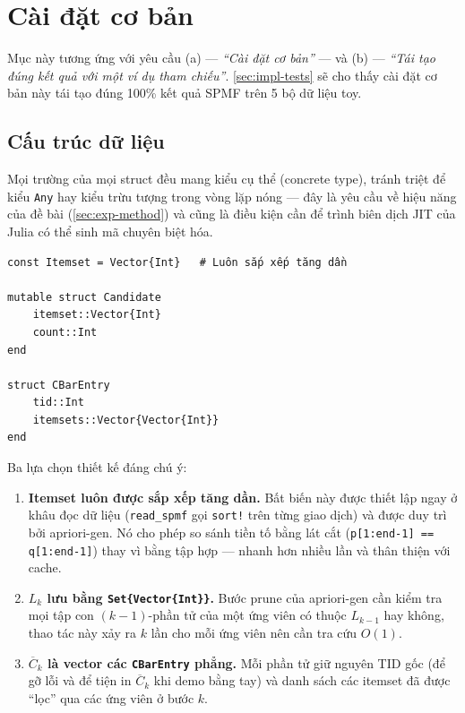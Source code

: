 \section{Cài đặt cơ bản}
\label{sec:impl-core}

Mục này tương ứng với yêu cầu (a) --- \emph{``Cài đặt cơ bản''} --- và (b) --- \emph{``Tái tạo đúng kết quả với một ví dụ tham chiếu''}. \autoref{sec:impl-tests} sẽ cho thấy cài đặt cơ bản này tái tạo đúng 100\% kết quả SPMF trên 5 bộ dữ liệu toy.

\subsection{Cấu trúc dữ liệu}

Mọi trường của mọi struct đều mang kiểu cụ thể (concrete type), tránh triệt để kiểu \texttt{Any} hay kiểu trừu tượng trong vòng lặp nóng --- đây là yêu cầu về hiệu năng của đề bài (\autoref{sec:exp-method}) và cũng là điều kiện cần để trình biên dịch JIT của Julia có thể sinh mã chuyên biệt hóa.

\begin{verbatim}
const Itemset = Vector{Int}   # Luôn sắp xếp tăng dần

mutable struct Candidate
    itemset::Vector{Int}
    count::Int
end

struct CBarEntry
    tid::Int
    itemsets::Vector{Vector{Int}}
end
\end{verbatim}

Ba lựa chọn thiết kế đáng chú ý:
\begin{enumerate}
    \item \textbf{Itemset luôn được sắp xếp tăng dần.} Bất biến này được thiết lập ngay ở khâu đọc dữ liệu (\texttt{read\_spmf} gọi \texttt{sort!} trên từng giao dịch) và được duy trì bởi apriori-gen. Nó cho phép so sánh tiền tố bằng lát cắt (\texttt{p[1:end-1] == q[1:end-1]}) thay vì bằng tập hợp --- nhanh hơn nhiều lần và thân thiện với cache.
    \item \textbf{$L_k$ lưu bằng \texttt{Set\{Vector\{Int\}\}}.} Bước prune của apriori-gen cần kiểm tra mọi tập con $(k-1)$-phần tử của một ứng viên có thuộc $L_{k-1}$ hay không, thao tác này xảy ra $k$ lần cho mỗi ứng viên nên cần tra cứu $O(1)$.
    \item \textbf{$\overline{C}_k$ là vector các \texttt{CBarEntry} phẳng.} Mỗi phần tử giữ nguyên TID gốc (để gỡ lỗi và để tiện in $\overline{C}_k$ khi demo bằng tay) và danh sách các itemset đã được ``lọc'' qua các ứng viên ở bước $k$.
\end{enumerate}

